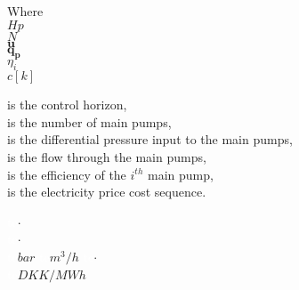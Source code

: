 
\begin{minipage}[t]{0.20\textwidth}
Where\\
 \hspace*{8mm} $Hp$ \\
 \hspace*{8mm} $N$ \\
\hspace*{8mm} $\pmb{u}$ \\
\hspace*{8mm} $\pmb{q_p}$ \\
 \hspace*{8mm} $\eta_i$ \\
\hspace*{8mm} $c[k]$ 
\end{minipage}
\begin{minipage}[t]{0.68\textwidth}
\vspace*{2mm}
 is the control horizon, \\
 is the number of main pumps,\\
is the differential pressure input to the main pumps,\\
is the flow through the main pumps,\\
is the efficiency of the $i^{th}$ main pump,\\
is the electricity price cost sequence.
\end{minipage}
\begin{minipage}[t]{0.10\textwidth}
\vspace*{2mm}
 \textcolor{White}{te}$\unit{\cdot}$\\
 \textcolor{White}{te}$\unit{\cdot}$\\
\textcolor{White}{te}$\unit{bar}$
\textcolor{White}{te}$\unit{m^3/h}$
 \textcolor{White}{te}$\unit{\cdot}$\\
\textcolor{White}{te}$\unit{DKK/MWh}$
\end{minipage}

